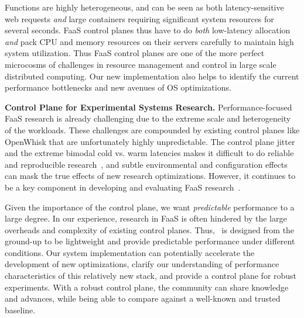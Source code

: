 Functions are highly heterogeneous, and can be seen as both latency-sensitive web requests \emph{and} large containers requiring significant system resources for several seconds. 
FaaS control planes thus have to do \emph{both} low-latency allocation \emph{and} pack CPU and memory resources on their servers carefully to maintain high system utilization.
Thus FaaS control planes are one of the more perfect microcosms of challenges in resource management and control in large scale distributed computing. 
%
Our new implementation also helps to identify the current performance bottlenecks and new avenues of OS optimizations. 


\textbf{Control Plane for Experimental Systems Research.}
%
Performance-focused FaaS research is already challenging due to the extreme scale and heterogeneity of the workloads.
These challenges are compounded by existing control planes like OpenWhisk that are unfortunately highly unpredictable.
The control plane jitter and the extreme bimodal cold vs. warm latencies makes it difficult to do reliable and reproducible research~\cite{mytkowicz2009producing}, and subtle environmental and configuration effects can mask the true effects of new research optimizations.
However, it continues to be a key component in developing and evaluating FaaS research~\cite{akkus_sand_2018, shahrad_serverless_2020, faascache-asplos21, faaslb-hpdc22, zhou2022aquatope, ensure-faas-acsos20, alzayat_groundhog_2022}. 

Given the importance of the control plane, we want \emph{predictable} performance to a large degree. 
In our experience, research in FaaS is often hindered by the large overheads and complexity of existing control planes. 
Thus, \sysname~is designed from the ground-up to be lightweight and provide predictable performance under different conditions. 
Our system implementation can potentially accelerate the development of new optimizations, clarify our understanding of performance characteristics of this relatively new stack, and provide a control plane for robust experiments. 
With a robust control plane, the community can share knowledge and advances, while being able to compare against a well-known and trusted baseline.

